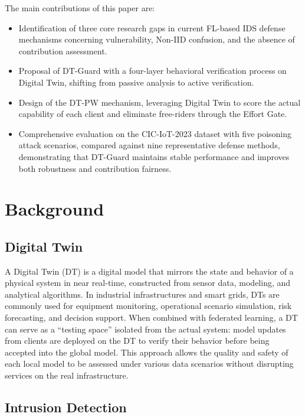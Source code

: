 \documentclass[runningheads]{llncs}
\begin{document}
The main contributions of this paper are:

\begin{itemize}
    \item Identification of three core research gaps in current FL-based IDS defense mechanisms concerning vulnerability, Non-IID confusion, and the absence of contribution assessment.

    \item Proposal of DT-Guard with a four-layer behavioral verification process on Digital Twin, shifting from passive analysis to active verification.

    \item Design of the DT-PW mechanism, leveraging Digital Twin to score the actual capability of each client and eliminate free-riders through the Effort Gate.

    \item Comprehensive evaluation on the CIC-IoT-2023 dataset with five poisoning attack scenarios, compared against nine representative defense methods, demonstrating that DT-Guard maintains stable performance and improves both robustness and contribution fairness.
\end{itemize}


\section{Background}


\subsection{Digital Twin}

A Digital Twin (DT) is a digital model that mirrors the state and behavior of a physical system in near real-time, constructed from sensor data, modeling, and analytical algorithms. In industrial infrastructures and smart grids, DTs are commonly used for equipment monitoring, operational scenario simulation, risk forecasting, and decision support. When combined with federated learning, a DT can serve as a ``testing space'' isolated from the actual system: model updates from clients are deployed on the DT to verify their behavior before being accepted into the global model. This approach allows the quality and safety of each local model to be assessed under various data scenarios without disrupting services on the real infrastructure.

\subsection{Intrusion Detection}
\end{document}
